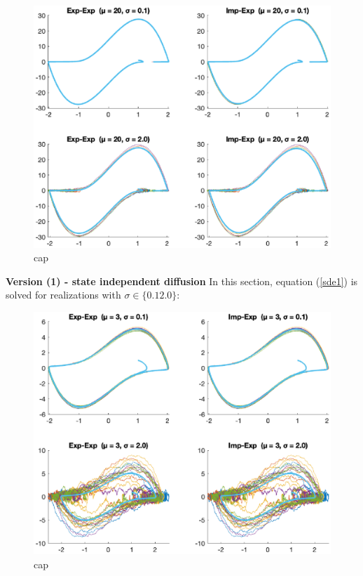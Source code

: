 \begin{figure}
    \centering
    \includegraphics[width=\textwidth]{plots/4a.eps}
    \caption{cap}
    \label{fig:4a}
\end{figure}

\textbf{Version (1) - state independent diffusion}
In this section, equation (\ref{sde1}) is solved for realizations with $\sigma \in \{0.1 2.0\}$:

\begin{figure}
    \centering
    \includegraphics[width=\textwidth]{plots/4b.eps}
    \caption{cap}
    \label{fig:4b}
\end{figure}

